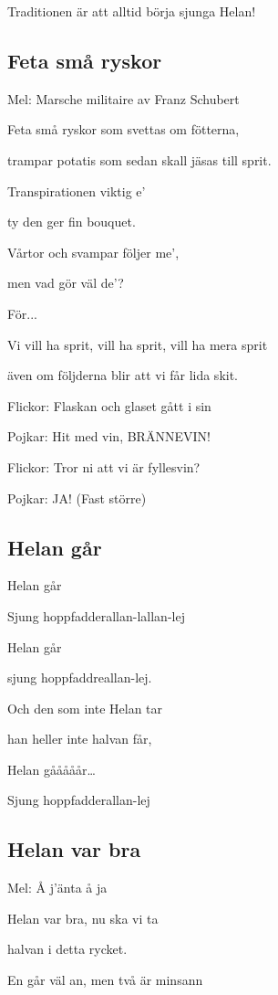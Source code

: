 Traditionen är att alltid börja sjunga Helan!

\subsection{\textbf{Feta små ryskor}}

Mel: Marsche militaire av Franz Schubert\bigskip

Feta små ryskor som svettas om fötterna,

trampar potatis som sedan skall jäsas till sprit.

Transpirationen viktig e’

ty den ger fin bouquet.

Vårtor och svampar följer me’,

men vad gör väl de’?\bigskip

För...

Vi vill ha sprit, vill ha sprit, vill ha mera sprit

även om följderna blir att vi får lida skit.

Flickor: Flaskan och glaset gått i sin

Pojkar: Hit med vin, BRÄNNEVIN!

Flickor: Tror ni att vi är fyllesvin?

Pojkar: JA! (Fast större)

\subsection{\textbf{Helan går}}

Helan går

Sjung hoppfadderallan-lallan-lej

Helan går

sjung hoppfaddreallan-lej.

Och den som inte Helan tar

han heller inte halvan får,

Helan gååååår…\bigskip

Sjung hoppfadderallan-lej

\subsection{\textbf{Helan var bra }}

Mel: Å j’änta å ja\bigskip


Helan var bra, nu ska vi ta

halvan i detta rycket.

En går väl an, men två är minsann

